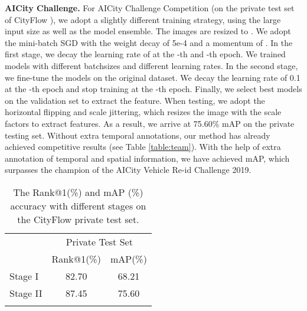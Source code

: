 \documentclass[journal]{IEEEtran}
\begin{document}
\textbf{AICity Challenge.} For AICity Challenge Competition (on the private test set of CityFlow \cite{tang@cityflow}), we adopt a slightly different training strategy, using the large input size as well as the model ensemble. The images are resized to . We adopt the mini-batch SGD with the weight decay of 5e-4 and a momentum of . In the first stage, we decay the learning rate of  at the -th and -th epoch. We trained  models with different batchsizes and different learning rates. In the second stage, we fine-tune the models on the original dataset. We decay the learning rate of 0.1 at the -th epoch and stop training at the -th epoch. Finally, we select  best models on the validation set to extract the feature. When testing, we adopt the horizontal flipping and scale jittering, which resizes the image with the scale factors  to extract features. As a result, we arrive at 75.60\% mAP on the private testing set. Without extra temporal annotations, our method has already achieved competitive results (see Table  \ref{table:team}). With the help of extra annotation of temporal and spatial information, we have achieved  mAP, which surpasses the champion of the AICity Vehicle Re-id Challenge 2019.

\begin{table}
\caption{The Rank@1(\%) and mAP (\%) accuracy with different stages on the CityFlow private test set. }
\label{table:stage}
\vspace{-.2in}
\begin{center}
{
\setlength{\tabcolsep}{15pt}
\begin{tabular}{l | c c}
\shline
\multirow{2}{*}{} & \multicolumn{2}{c}{Private Test Set}\\
   & Rank@1(\%) & mAP(\%) \\
\hline
Stage I & 82.70 &  68.21 \\
Stage II & 87.45 &  75.60 \\
\shline
\end{tabular}}
\end{center}
\vspace{-.2in}
\end{table}
\end{document}
